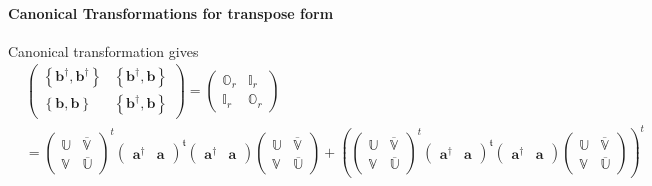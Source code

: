 \documentclass[aps, preprint]{revtex4}
\begin{document}
\paragraph{Canonical Transformations for transpose form}
Canonical transformation gives
\begin{align} & \left (\begin{array}{cc}\left \{\mathbf{b}^{ \dag } ,\mathbf{b}^{ \dag }\right \} & \left \{\mathbf{b}^{ \dag } ,\mathbf{b}\right \} \\
\left \{\mathbf{b} ,\mathbf{b}\right \} & \left \{\mathbf{b}^{ \dag } ,\mathbf{b}\right \}\end{array}\right ) =\left (\begin{array}{cc}\mathbb{O}_{r} & \mathbb{I}_{r} \\
\mathbb{I}_{r} & \mathbb{O}_{r}\end{array}\right ) \nonumber  \\
 &  =\left (\begin{array}{cc}\mathbb{U} & \overline{\mathbb{V}} \\
\mathbb{V} & \overline{\mathbb{U}}\end{array}\right )^{t} \left (\begin{array}{cc}\mathbf{a}^{ \dag } & \mathbf{a}\end{array}\right )^{\mathfrak{t}} \left (\begin{array}{cc}\mathbf{a}^{ \dag } & \mathbf{a}\end{array}\right ) \left (\begin{array}{cc}\mathbb{U} & \overline{\mathbb{V}} \\
\mathbb{V} & \overline{\mathbb{U}}\end{array}\right ) +\left (\left (\begin{array}{cc}\mathbb{U} & \overline{\mathbb{V}} \\
\mathbb{V} & \overline{\mathbb{U}}\end{array}\right )^{t} \left (\begin{array}{cc}\mathbf{a}^{ \dag } & \mathbf{a}\end{array}\right )^{\mathfrak{t}} \left (\begin{array}{cc}\mathbf{a}^{ \dag } & \mathbf{a}\end{array}\right ) \left (\begin{array}{cc}\mathbb{U} & \overline{\mathbb{V}} \\
\mathbb{V} & \overline{\mathbb{U}}\end{array}\right )\right )^{t} \\

\end{align}
\end{document}
